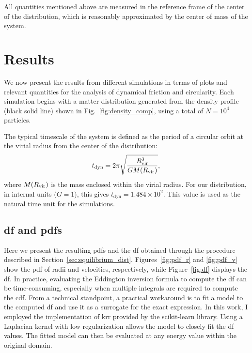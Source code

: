 \documentclass[twocolumn, a4paper]{article}
\begin{document}
All quantities mentioned above are measured in the reference frame of the center of the distribution, which is reasonably approximated by the center of mass of the system.

\section{Results}

We now present the results from different simulations in terms of plots and relevant quantities for the analysis of dynamical friction and circularity. Each simulation begins with a matter distribution generated from the density profile (black solid line) shown in Fig.~\ref{fig:density_comp}, using a total of \(N = 10^4\) particles.

The typical timescale of the system is defined as the period of a circular orbit at the virial radius from the center of the distribution:
\begin{equation}
    t_\text{dyn} = 2\pi \sqrt{\dfrac{R_\text{vir}^3}{G M\qty(R_\text{vir})}},
    \label{eq:t_dyn}
\end{equation}
where \(M\qty(R_\text{vir})\) is the mass enclosed within the virial radius. For our distribution, in internal units (\(G = 1\)), this gives \(t_\text{dyn} = 1.484 \times 10^2\). This value is used as the natural time unit for the simulations.

\subsection{\acrlong{df} and \acrlong{pdf}s}

Here we present the resulting \acrshort{pdf}s and the \acrshort{df} obtained through the procedure described in Section~\ref{sec:equilibrium_dist}. Figures~\ref{fig:pdf_r} and \ref{fig:pdf_v} show the \acrshort{pdf} of radii and velocities, respectively, while Figure~\ref{fig:df} displays the \acrshort{df}. In practice, evaluating the Eddington inversion formula to compute the \acrshort{df} can be time-consuming, especially when multiple integrals are required to compute the \acrshort{cdf}. From a technical standpoint, a practical workaround is to fit a model to the computed \acrshort{df} and use it as a surrogate for the exact expression. In this work, I employed the implementation of \acrfull{krr} provided by the scikit-learn library. Using a Laplacian kernel with low regularization allows the model to closely fit the \acrshort{df} values. The fitted model can then be evaluated at any energy value within the original domain.
\end{document}
